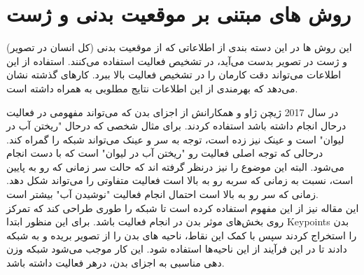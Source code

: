 \section{روش های مبتنی بر موقعیت بدنی و ژست}

این روش ها در این دسته بندی از اطلاعاتی که از موقعیت بدنی (کل انسان در تصویر) و ژست در تصویر بدست می‌آید، در تشخیص فعالیت استفاده می‌کنند. استفاده از این اطلاعات می‌تواند دقت کارمان را در تشخیص فعالیت بالا ببرد. کارهای گذشته نشان می‌دهد که بهرمندی از این اطلاعات نتایج مطلوبی به همراه داشته است.

در سال 2017 ژیچن ژاو و همکارانش %
\cite{Single_image_semantic_body}
از اجزای بدن که می‌تواند مفهومی در فعالیت درحال انجام داشته باشد استفاده کردند. برای مثال شخصی که درحال "ریختن آب در لیوان" است و عینک نیز زده است، توجه به سر و عینک می‌تواند شبکه را گمراه کند. درحالی که توجه اصلی فعالیت رو "ریختن آب در لیوان" است که با دست انجام می‌شود. البته این موضوع را نیز درنظر گرفته اند که حالت سر زمانی که رو به پایین است،‌ نسبت به زمانی که سربه رو به بالا است فعالیت متفاوتی را می‌تواند شکل دهد. زمانی که سر رو به بالا است احتمال انجام فعالیت "نوشیدن آب" بیشتر است.\\
این مقاله نیز از این مفهوم استفاده کرده است تا شبکه را طوری طراحی کند که تمرکز روی بخش‌های موثر بدن در انجام فعالیت باشد. برای این منظور ابتدا %
\gls{Keypoints}
بدن را استخراج کردند سپس با کمک این نقاط،‌ ناحیه های بدن را از تصویر بریده و به شبکه دادند تا در این فرآیند از این ناحیه‌ها استفاده شود.  این کار موجب می‌شود شبکه وزن دهی مناسبی به اجزای بدن،‌ درهر فعالیت داشته باشد.
 
